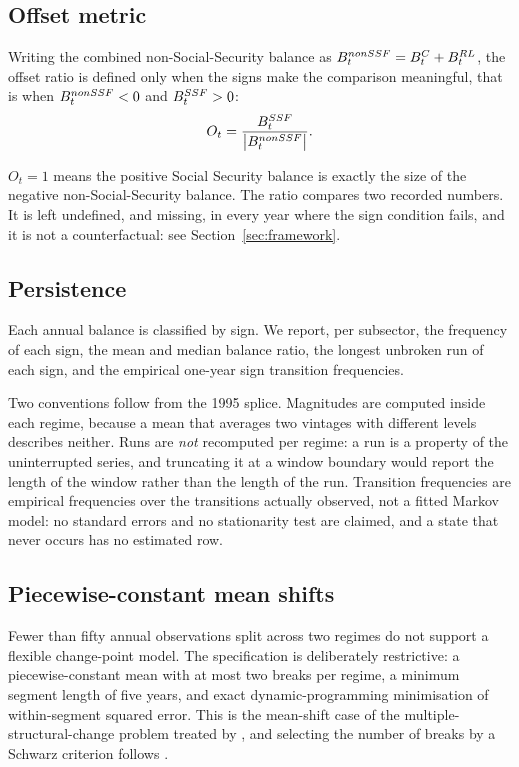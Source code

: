 \subsection{Offset metric}

Writing the combined non-Social-Security balance as
$B^{nonSSF}_t = B^{C}_t + B^{RL}_t$, the offset ratio is defined only when the signs make
the comparison meaningful, that is when $B^{nonSSF}_t < 0$ and $B^{SSF}_t > 0$:
\begin{equation}
O_t = \frac{B^{SSF}_t}{\left|B^{nonSSF}_t\right|}.
\label{eq:offset}
\end{equation}

$O_t = 1$ means the positive Social Security balance is exactly the size of the
negative non-Social-Security balance. The ratio compares two recorded numbers. It
is left undefined, and missing, in every year where the sign condition fails, and
it is not a counterfactual: see Section~\ref{sec:framework}.

\subsection{Persistence}

Each annual balance is classified by sign. We report, per subsector, the frequency
of each sign, the mean and median balance ratio, the longest unbroken run of each
sign, and the empirical one-year sign transition frequencies.

Two conventions follow from the 1995 splice. Magnitudes are computed inside each
regime, because a mean that averages two vintages with different levels describes
neither. Runs are \emph{not} recomputed per regime: a run is a property of the
uninterrupted series, and truncating it at a window boundary would report the
length of the window rather than the length of the run. Transition frequencies are
empirical frequencies over the transitions actually observed, not a fitted Markov
model: no standard errors and no stationarity test are claimed, and a state that
never occurs has no estimated row.

\subsection{Piecewise-constant mean shifts}

Fewer than fifty annual observations split across two regimes do not support a
flexible change-point model. The specification is deliberately restrictive: a
piecewise-constant mean with at most two breaks per regime, a minimum segment
length of five years, and exact dynamic-programming minimisation of within-segment
squared error. This is the mean-shift case of the multiple-structural-change problem
treated by \citet{baiperron1998}, and selecting the number of breaks by a Schwarz
criterion follows \citet{yao1988}.

